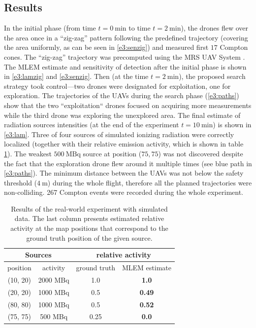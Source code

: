 
\subsection{Results}
In the initial phase (from time $t = \SI{0}{\minute}$ to time $t = \SI{2}{\minute}$), the drones flew over the area once in a ``zig-zag'' pattern following the predefined trajectory (covering the area uniformly, as can be seen in \ref{e3:senzig}) and measured first $17$ Compton cones.
The ``zig-zag'' trajectory was precomputed using the MRS UAV System \cite{mrs_system}.
The \ac{MLEM} estimate and sensitivity of detection after the initial phase is shown in \ref{e3:lamzig} and \ref{e3:senzig}.
Then (at the time $t = \SI{2}{\minute}$), the proposed search strategy took control---two drones were designated for exploitation, one for exploration.
The trajectories of the \ac{UAV}s during the search phase (\ref{e3:paths}) show that the two ``exploitation`` drones focused on acquiring more measurements while the third drone was exploring the unexplored area.
The final estimate of radiation sources intensities (at the end of the experiment $t = \SI{10}{\minute}$) is shown in \ref{e3:lam}.
Three of four sources of simulated ionizing radiation were correctly localized (together with their relative emission activity, which is shown in table \ref{tab:temenight_results}).
The weakest $\SI{500}{\mega\becquerel}$ source at position ($75, 75$) was not discovered despite the fact that the exploration drone flew around it multiple times (see blue path in \autoref{e3:paths}).
The minimum distance between the \ac{UAV}s was not below the safety threshold ($\SI{4}{\meter}$) during the whole flight, therefore all the planned trajectories were non-colliding.
267 Compton events were recorded during the whole experiment.
\begin{table}[htb]
\begin{center}
  \begin{tabular}{ |c|c|c|c| } 
 \hline
    \multicolumn{2}{|c}{Sources} &  \multicolumn{2}{|c|}{ relative activity } \\
 \hline
    position & activity & ground truth & MLEM estimate\\ 
 \hline
    (10, 20) & 2000 MBq & 1.0  & \textbf{1.0} \\ 
    (20, 20) & 1000 MBq &  0.5 & \textbf{0.49} \\ 
    (80, 80) & 1000 MBq &  0.5 & \textbf{0.52} \\ 
    (75, 75) & 500 MBq &  0.25 & \textbf{0.0} \\ 
 \hline
\end{tabular}
  \caption{Results of the real-world experiment with simulated data. The last column presents estimated relative activity at the map positions that correspond to the ground truth position of the given source.}
  \label{tab:temenight_results}
\end{center}
\end{table}

